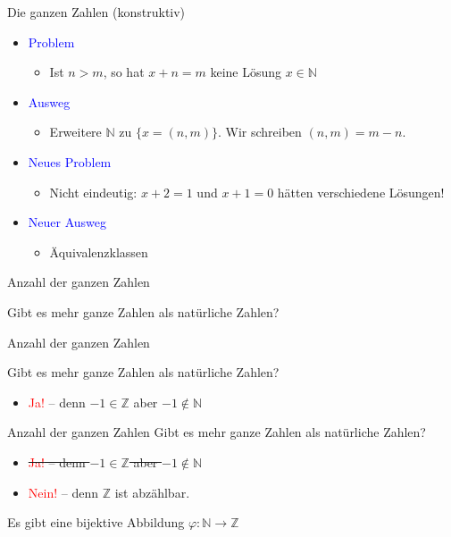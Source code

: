 \documentclass[12pt%
,aspectratio=169%
]{beamer}
\begin{document}
\begin{frame}{Die ganzen Zahlen (konstruktiv)}
\begin{itemize}
	\item \textcolor{blue}{Problem}
	\begin{itemize}
		\item Ist $n > m$, so hat $x + n = m$ keine Lösung $x \in \mathbb{N}$
	\end{itemize}
	\item \textcolor{blue}{Ausweg}
	\begin{itemize}
		\item Erweitere $\mathbb{N}$ zu $\{x = (n, m)\}$. Wir schreiben $(n, m) = m - n$.
	\end{itemize}
	\item \textcolor{blue}{Neues Problem}
	\begin{itemize}
		\item Nicht eindeutig: $x + 2 = 1$ und $x + 1 = 0$ hätten verschiedene Lösungen!
	\end{itemize}
	\item \textcolor{blue}{Neuer Ausweg}
	\begin{itemize}
		\item Äquivalenzklassen 
	\end{itemize}
\end{itemize}
\end{frame}

\begin{frame}{Anzahl der ganzen Zahlen}
\begin{center}
	Gibt es mehr ganze Zahlen als natürliche Zahlen?
\end{center}
\end{frame}

\begin{frame}{Anzahl der ganzen Zahlen}
\begin{center}
	Gibt es mehr ganze Zahlen als natürliche Zahlen?
	\begin{itemize}
		\item \textcolor{red}{Ja!} -- denn $-1 \in \mathbb{Z}$ aber $-1 \not \in \mathbb{N}$
	\end{itemize}
\end{center}
\end{frame}

\begin{frame}{Anzahl der ganzen Zahlen}
	Gibt es mehr ganze Zahlen als natürliche Zahlen?
	\begin{itemize}
		\item \sout{\textcolor{red}{Ja!} -- denn $-1 \in \mathbb{Z}$ aber $-1 \not \in \mathbb{N}$}
		\item \textcolor{red}{Nein!} -- denn $\mathbb{Z}$ ist abzählbar.
	\end{itemize}
	Es gibt eine bijektive Abbildung $\varphi : \mathbb{N} \to \mathbb{Z}$
\end{frame}
\end{document}
